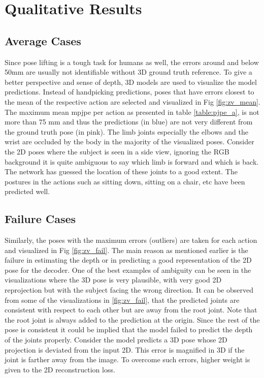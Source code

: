 \section{Qualitative Results}
\subsection{Average Cases}
Since pose lifting is a tough task for humans as well, the errors around and below 50mm are usually not identifiable without 3D ground truth reference. To give a better perspective and sense of depth, 3D models are used to visualize the model predictions. Instead of handpicking predictions, poses that have errors closest to the mean of the respective action are selected and visualized in Fig \ref{fig:zv_mean}. The maximum mean \ac{mpjpe} per action as presented in table \ref{table:pjpe_a}, is not more than 75 mm and thus the predictions (in blue) are not very different from the ground truth pose (in pink). The limb joints especially the elbows and the wrist are occluded by the body in the majority of the visualized poses. Consider the 2D poses where the subject is seen in a side view, ignoring the RGB background it is quite ambiguous to say which limb is forward and which is back. The network has guessed the location of these joints to a good extent. The postures in the actions such as sitting down, sitting on a chair, etc have been predicted well.




\subsection{Failure Cases}

Similarly, the poses with the maximum errors (outliers) are taken for each action and visualized in Fig \ref{fig:zv_fail}. The main reason as mentioned earlier is the failure in estimating the depth or in predicting a good representation of the 2D pose for the decoder. One of the best examples of ambiguity can be seen in the visualizations where the 3D pose is very plausible, with very good 2D reprojection but with the subject facing the wrong direction. It can be observed from some of the visualizations in \ref{fig:zv_fail}, that the predicted joints are consistent with respect to each other but are away from the root joint. Note that the root joint is always added to the prediction at the origin. Since the rest of the pose is consistent it could be implied that the model failed to predict the depth of the joints properly. Consider the model predicts a 3D pose whose 2D projection is deviated from the input 2D. This error is magnified in 3D if the joint is farther away from the image. To overcome such errors, higher weight is given to the 2D reconstruction loss.

